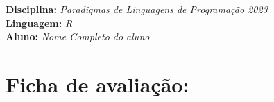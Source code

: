 



\noindent
\textbf{Disciplina:} \textit{Paradigmas de Linguagens de Programa\c{c}\~{a}o 2023}\\
\textbf{Linguagem:} \textit{R}\\
\textbf{Aluno:} \textit{ \color{blue} Nome Completo do aluno}


\section*{Ficha de avalia\c{c}\~{a}o:}




